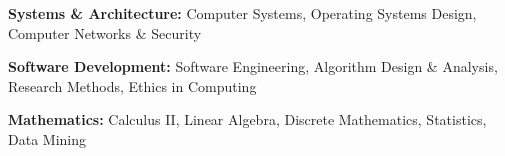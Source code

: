 
\textbf{Systems \& Architecture:} Computer Systems, Operating Systems Design, Computer Networks \& Security

\textbf{Software Development:} Software Engineering, Algorithm Design \& Analysis, Research Methods, Ethics in Computing

\textbf{Mathematics:} Calculus II, Linear Algebra, Discrete Mathematics, Statistics, Data Mining
